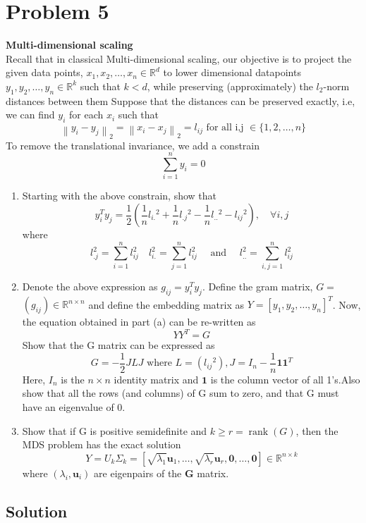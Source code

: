 \section*{Problem 5}

\textbf{Multi-dimensional scaling}\\
Recall that in classical Multi-dimensional scaling, our objective is to project the given data points, \( x_{1}, x_{2}, \ldots, x_{n} \in \mathbb{R}^{d} \) to lower dimensional datapoints \( y_{1}, y_{2}, \ldots, y_{n} \in \mathbb{R}^{k} \) such that \( k<d \), while preserving (approximately) the \( l_{2} \)-norm distances between them Suppose that the distances can be preserved exactly, i.e, we can find \( y_{i} \) for each \( x_{i} \) such that
\[
    \left \| y_{i}-y_{j}\right \| _{2}=\left \| x_{i}-x_{j}\right \| _{2}=l_{i j} \text { for all i,j } \in \{ 1,2, \ldots, n \}
\]
To remove the translational invariance, we add a constrain
\[
    \sum_{i=1}^{n} y_{i}=0
\]

\begin{enumerate}[label= (\alph*), noitemsep, topsep=0pt]
    \item Starting with the above constrain, show that
          \[
              y_{i}^{T} y_{j}=\frac{1}{2}\left(\frac{1}{n} l_{i .}{ }^{2}+\frac{1}{n} l_{. j}{ }^{2}-\frac{1}{n} l_{. .}{ }^{2}-l_{i j}{ }^{2}\right), \quad \forall i, j
          \]
          where
          \[
              l_{. j}^{2}=\sum_{i=1}^{n} l_{i j}^{2} \quad l_{i .}^{2}=\sum_{j=1}^{n} l_{i j}^{2} \quad \text { and } \quad l_{. .}^{2}=\sum_{i, j=1}^{n} l_{i j}^{2}
          \]

    \item Denote the above expression as \( g_{i j}=y_{i}^{T} y_{j} \).
          Define the gram matrix, \( G= \) \( \left(g_{i j}\right) \in \mathbb{R}^{n \times n} \) and define the embedding matrix as \( Y=\left[y_{1}, y_{2}, \ldots, y_{n}\right]^{T} \).
          Now, the equation obtained in part (a) can be re-written as
          \[
              Y Y^{T}=G
          \]
          Show that the G matrix can be expressed as
          \[
              G=-\frac{1}{2} J L J \text { where } L=\left(l_{i j}{ }^{2}\right), J=I_{n}-\frac{1}{n} \mathbf{1 1}^{T}
          \]
          Here, \( I_{n} \) is the \( n \times n \) identity matrix and \( \mathbf{1} \) is the column vector of all 1's.Also show that all the rows (and columns) of G sum to zero, and that G must have an eigenvalue of 0.

    \item Show that if G is positive semidefinite and \( k \geq r=\operatorname{rank}(G) \), then the MDS problem has the exact solution
          \[
              Y=U_{k} \Sigma_{k}=\left[\sqrt{\lambda_{1}} \mathbf{u}_{1}, \ldots, \sqrt{\lambda_{r}} \mathbf{u}_{r}, \mathbf{0}, \ldots, \mathbf{0}\right] \in \mathbb{R}^{n \times k}
          \]
          where \( \left(\lambda_{i}, \mathbf{u}_{i}\right) \) are eigenpairs of the \( \mathbf{G} \) matrix.
\end{enumerate}

\subsection*{Solution}

